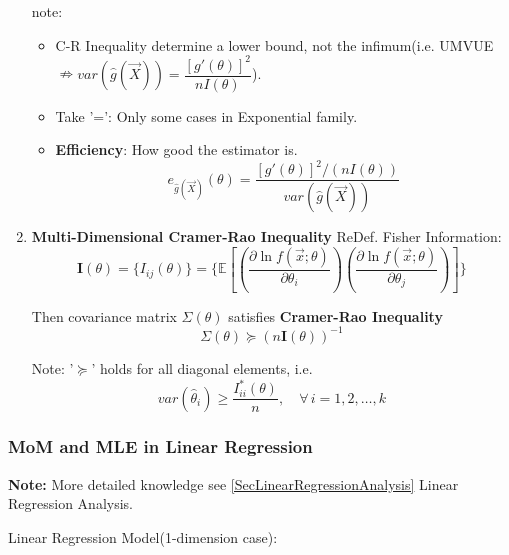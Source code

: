 \begin{enumerate}
    note:
    \begin{itemize}
        \item C-R Inequality determine a lower bound, not the infimum(i.e. UMVUE$\nRightarrow var(\hat{g}(\vec{X}))=\dfrac{[g'(\theta)]^2}{nI(\theta)}$).
        \item Take '=': Only some cases in Exponential family.
        \item \textbf{Efficiency}: How good the estimator is.
        \begin{equation}
            e_{\hat{g}(\vec{X})}(\theta)=   \frac{[g'(\theta)]^2/(nI(\theta))}{var(\hat{g}(\vec{X}))} 
        \end{equation} 
    \end{itemize}


\item \textbf{Multi-Dimensional Cramer-Rao Inequality}
    ReDef. Fisher Information:
    \begin{equation}
        \mathbf{I}(\theta)=\{I_{ij}(\theta)\}=\{\mathbb{E}\left[\left(\frac{\partial\ln f(\vec{x};\theta)}{\partial\theta_i}\right)\left(\frac{\partial\ln f(\vec{x};\theta)}{\partial\theta_j}\right)\right]\}  
    \end{equation}

    Then covariance matrix $\Sigma(\theta)$ satisfies \textbf{Cramer-Rao Inequality}
    \begin{equation}
        \Sigma(\theta)\succeq  (n\mathbf{I}(\theta))^{-1}
    \end{equation}

    Note: '$\succeq $' holds for all diagonal elements, i.e.
\begin{equation}
    var(\hat{\theta}_i)\geq \frac{I^*_{ii}(\theta)}{n},\quad \forall\,i=1,2,\ldots,k  
\end{equation}


    
\end{enumerate}






\subsubsection{MoM and MLE in Linear Regression}\label{SubSectionMoM_MLE_LinearRegression}
    \textbf{Note:} More detailed knowledge see \autoref{SecLinearRegressionAnalysis} Linear Regression Analysis.

\begin{point}
    Linear Regression Model(1-dimension case):
\end{point}

